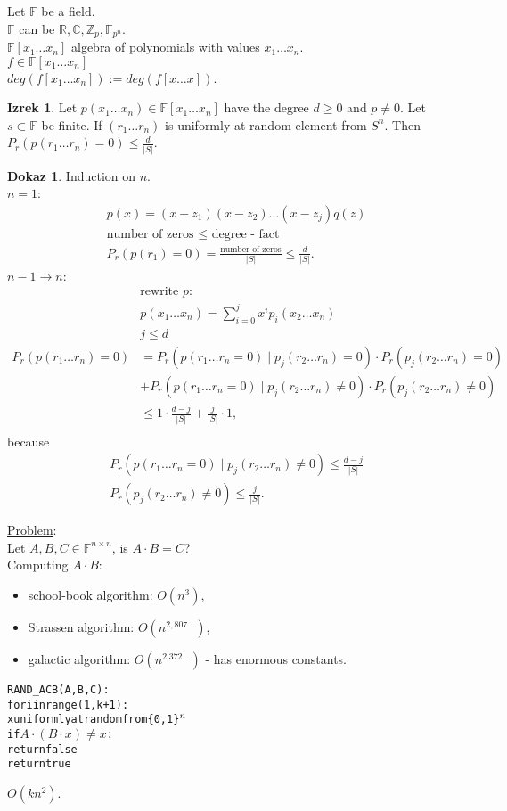 \documentclass[a4paper, 12pt]{book}
\theoremstyle{definition}
\newtheorem{theorem}[counter]{Izrek}
\newtheorem{pro}[counter]{Dokaz}
\theoremstyle{remark}
\newcommand{\Z}{\mathbb{Z}}
\newcommand{\R}{\mathbb{R}}
\newcommand{\C}{\mathbb{C}}
\newcommand{\F}{\mathbb{F}}
\begin{document}
Let $\F$ be a field. \\
$\F$ can be $\R, \C, \Z_p, \F_{p^n}$. \\
$\F[x_1 \dots x_n]$ algebra of polynomials with values $x_1 \dots x_n$. \\
$f \in \F[x_1 \dots x_n]$ \\
$deg(f[x_1 \dots x_n]) := deg(f[x \dots x])$.
\begin{theorem}
  Let $p(x_1 \dots x_n) \in \F[x_1 \dots x_n]$ have the degree $d \geq 0$ and $p \neq 0$.
  Let $s \subset \F$ be finite.
  If $(r_1 \dots r_n)$ is uniformly at random element from $S^n$.
  Then $P_r(p(r_1 \dots r_n) = 0) \leq \frac{d}{|S|}$.
\end{theorem}
\begin{pro}
  Induction on $n$. \\
  $n=1$:
  \begin{align*}
    &p(x) = (x-z_1) (x-z_2) \dots (x-z_j) q(z) \\
    &\text{number of zeros } \leq \text{ degree - fact} \\
    &P_r(p(r_1) = 0) = \frac{\text{number of zeros}}{|S|} \leq \frac{d}{|S|}.
  \end{align*}
  $n-1 \to n$:
  \begin{align*}
    &\text{rewrite }p: \\
    &p(x_1 \dots x_n) = \sum_{i=0}^{j} x^i p_i(x_2 \dots x_n) \\
    &j \leq d \\
    P_r(p(r_1 \dots r_n) = 0) &= P_r(p(r_1 \dots r_n = 0) \mid p_j(r_2 \dots r_n) = 0) \cdot P_r(p_j(r_2 \dots r_n) = 0) \\
    &+ P_r(p(r_1 \dots r_n = 0) \mid p_j(r_2 \dots r_n) \neq 0) \cdot P_r(p_j(r_2 \dots r_n) \neq 0) \\
    &\leq 1 \cdot \frac{d-j}{|S|} + \frac{j}{|S|} \cdot 1, \\
  \end{align*}
  because
  \begin{align*}
    &P_r(p(r_1 \dots r_n = 0) \mid p_j(r_2 \dots r_n) \neq 0) \leq \frac{d-j}{|S|} \\
    &P_r(p_j(r_2 \dots r_n) \neq 0) \leq \frac{j}{|S|}.
  \end{align*}
\end{pro}
\underline{Problem}: \\
Let $A,B,C \in \F^{n \times n}$, is $A \cdot B = C$? \\
Computing $A \cdot B$:
\begin{itemize}
  \item school-book algorithm: $O\left(n^3\right)$,
  \item Strassen algorithm: $O\left(n^{2,807\dots}\right)$,
  \item galactic algorithm: $O\left(n^{2.372\dots}\right)$ - has enormous constants.
\end{itemize}
\begin{alltt}
  RAND_ACB(A,B,C):
    for i in range(1,k+1):
      x uniformly at random from \{0,1\}\(\sp{n}\)
      if \(A \cdot (B \cdot x) \neq x\):
        return false
    return true
\end{alltt}
$O\left(k n^2\right)$.
\end{document}
